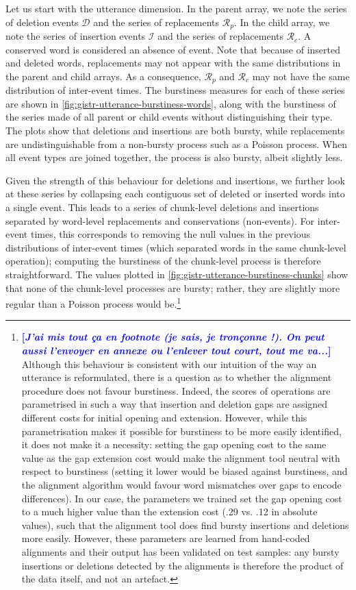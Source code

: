 \documentclass[a4paper,fleqn]{cas-dc}
\newcommand{\tb}[1]{\textcolor{blue}{#1}}
\newcommand{\rk}[1]{\tb{{\footnotesize {\bf[\emph{#1}]}}}}
\begin{document}
Let us start with the utterance dimension. In the parent array, we note
the series of deletion events \(\mathcal{D}\) and the series of
replacements \(\mathcal{R}_p\). In the child array, we note the series
of insertion events \(\mathcal{I}\) and the series of replacements
\(\mathcal{R}_c\). A conserved word is considered an absence of event.
Note that because of inserted and deleted words, replacements may not
appear with the same distributions in the parent and child arrays. As a
consequence, \(\mathcal{R}_p\) and \(\mathcal{R}_c\) may not have the
same distribution of inter-event times. The burstiness measures for each
of these series are shown in
\cref{fig:gistr-utterance-burstiness-words}, along with the burstiness
of the series made of all parent or child events without distinguishing
their type. The plots show that deletions and insertions are both
bursty, while replacements are undistinguishable from a non-bursty
process such as a Poisson process. When all event types are joined
together, the process is also bursty, albeit slightly less.

Given the strength of this behaviour for deletions and insertions, we
further look at these series by collapsing each contiguous set of
deleted or inserted words into a single event. This leads to a series of
chunk-level deletions and insertions separated by word-level
replacements and conservations (non-events). For inter-event times, this
corresponds to removing the null values in the previous distributions of
inter-event times (which separated words in the same chunk-level
operation); computing the burstiness of the chunk-level process is
therefore straightforward. The values plotted in
\cref{fig:gistr-utterance-burstiness-chunks} show that none of the
chunk-level processes are bursty; rather, they are slightly more regular
than a Poisson process would be.\footnote{\rk{J'ai mis tout ça en footnote (je sais, je tronçonne !). On peut aussi l'envoyer en annexe ou l'enlever tout court, tout me va...}
Although this behaviour is consistent with our intuition of the way an
utterance is reformulated, there is a question as to whether the
alignment procedure does not favour burstiness. Indeed, the scores of
operations are parametrised in such a way that insertion and deletion
gaps are assigned different costs for initial opening and extension.
However, while this parametrisation makes it possible for burstiness to
be more easily identified, it does not make it a necessity: setting the
gap opening cost to the same value as the gap extension cost would make
the alignment tool neutral with respect to burstiness (setting it lower
would be biased against burstiness, and the alignment algorithm would
favour word mismatches over gaps to encode differences). In our case,
the parameters we trained set the gap opening cost to a much higher
value than the extension cost (.29 vs. .12 in absolute values), such
that the alignment tool does find bursty insertions and deletions more
easily. However, these parameters are learned from hand-coded alignments
and their output has been validated on test samples: any bursty
insertions or deletions detected by the alignments is therefore the
product of the data itself, and not an artefact.}
\end{document}
